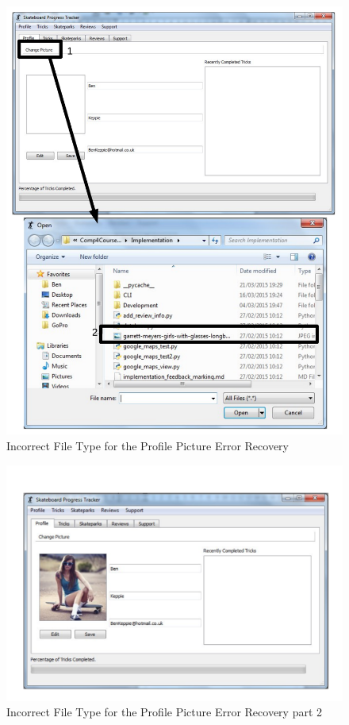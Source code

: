 \begin{figure}[H]
    \includegraphics[width=\textwidth]{./Manual/Images/PictureValidationR1.pdf}
    \caption{Incorrect File Type for the Profile Picture Error Recovery} \label{fig:PictureErrorR1}
\end{figure}

\begin{figure}[H]
    \includegraphics[width=\textwidth]{./Manual/Images/PictureValidationR2.pdf}
    \caption{Incorrect File Type for the Profile Picture Error Recovery part 2} \label{fig:PictureErrorR2}
\end{figure}


